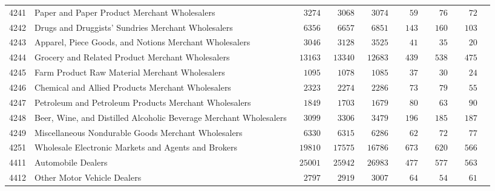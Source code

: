 \documentclass[9pt, oneside]{article}   	%
\begin{document}
\begin{longtable}{lp{3 in}ccccccc}
4241  & Paper and Paper Product Merchant Wholesalers & $\phantom{00}3274$ & $\phantom{00}3068$ & $\phantom{00}3074$ & $\phantom{000}59$ & $\phantom{000}76$ & $\phantom{000}72$ \\
4242  & Drugs and Druggists' Sundries Merchant Wholesalers & $\phantom{00}6356$ & $\phantom{00}6657$ & $\phantom{00}6851$ & $\phantom{00}143$ & $\phantom{00}160$ & $\phantom{00}103$ \\
4243  & Apparel, Piece Goods, and Notions Merchant Wholesalers & $\phantom{00}3046$ & $\phantom{00}3128$ & $\phantom{00}3525$ & $\phantom{000}41$ & $\phantom{000}35$ & $\phantom{000}20$ \\
4244  & Grocery and Related Product Merchant Wholesalers & $\phantom{0}13163$ & $\phantom{0}13340$ & $\phantom{0}12683$ & $\phantom{00}439$ & $\phantom{00}538$ & $\phantom{00}475$ \\
4245  & Farm Product Raw Material Merchant Wholesalers & $\phantom{00}1095$ & $\phantom{00}1078$ & $\phantom{00}1085$ & $\phantom{000}37$ & $\phantom{000}30$ & $\phantom{000}24$ \\
4246  & Chemical and Allied Products Merchant Wholesalers & $\phantom{00}2323$ & $\phantom{00}2274$ & $\phantom{00}2286$ & $\phantom{000}73$ & $\phantom{000}79$ & $\phantom{000}55$ \\
4247  & Petroleum and Petroleum Products Merchant Wholesalers & $\phantom{00}1849$ & $\phantom{00}1703$ & $\phantom{00}1679$ & $\phantom{000}80$ & $\phantom{000}63$ & $\phantom{000}90$ \\
4248  & Beer, Wine, and Distilled Alcoholic Beverage Merchant Wholesalers & $\phantom{00}3099$ & $\phantom{00}3306$ & $\phantom{00}3479$ & $\phantom{00}196$ & $\phantom{00}185$ & $\phantom{00}187$ \\
4249  & Miscellaneous Nondurable Goods Merchant Wholesalers & $\phantom{00}6330$ & $\phantom{00}6315$ & $\phantom{00}6286$ & $\phantom{000}62$ & $\phantom{000}72$ & $\phantom{000}77$ \\
4251  & Wholesale Electronic Markets and Agents and Brokers & $\phantom{0}19810$ & $\phantom{0}17575$ & $\phantom{0}16786$ & $\phantom{00}673$ & $\phantom{00}620$ & $\phantom{00}566$ \\
4411  & Automobile Dealers & $\phantom{0}25001$ & $\phantom{0}25942$ & $\phantom{0}26983$ & $\phantom{00}477$ & $\phantom{00}577$ & $\phantom{00}563$ \\
4412  & Other Motor Vehicle Dealers & $\phantom{00}2797$ & $\phantom{00}2919$ & $\phantom{00}3007$ & $\phantom{000}64$ & $\phantom{000}54$ & $\phantom{000}61$ \\

\end{longtable}
\end{document}
